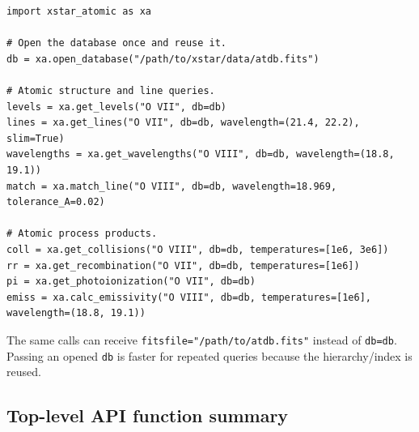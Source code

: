 \documentclass[11pt]{article}
\begin{document}
\begin{lstlisting}[style=ctpython]
import xstar_atomic as xa

# Open the database once and reuse it.
db = xa.open_database("/path/to/xstar/data/atdb.fits")

# Atomic structure and line queries.
levels = xa.get_levels("O VII", db=db)
lines = xa.get_lines("O VII", db=db, wavelength=(21.4, 22.2), slim=True)
wavelengths = xa.get_wavelengths("O VIII", db=db, wavelength=(18.8, 19.1))
match = xa.match_line("O VIII", db=db, wavelength=18.969, tolerance_A=0.02)

# Atomic process products.
coll = xa.get_collisions("O VIII", db=db, temperatures=[1e6, 3e6])
rr = xa.get_recombination("O VII", db=db, temperatures=[1e6])
pi = xa.get_photoionization("O VII", db=db)
emiss = xa.calc_emissivity("O VIII", db=db, temperatures=[1e6], wavelength=(18.8, 19.1))
\end{lstlisting}

The same calls can receive \texttt{fitsfile="/path/to/atdb.fits"} instead of \texttt{db=db}. Passing an opened \texttt{db} is faster for repeated queries because the hierarchy/index is reused.

\subsection{Top-level API function summary}
\end{document}
